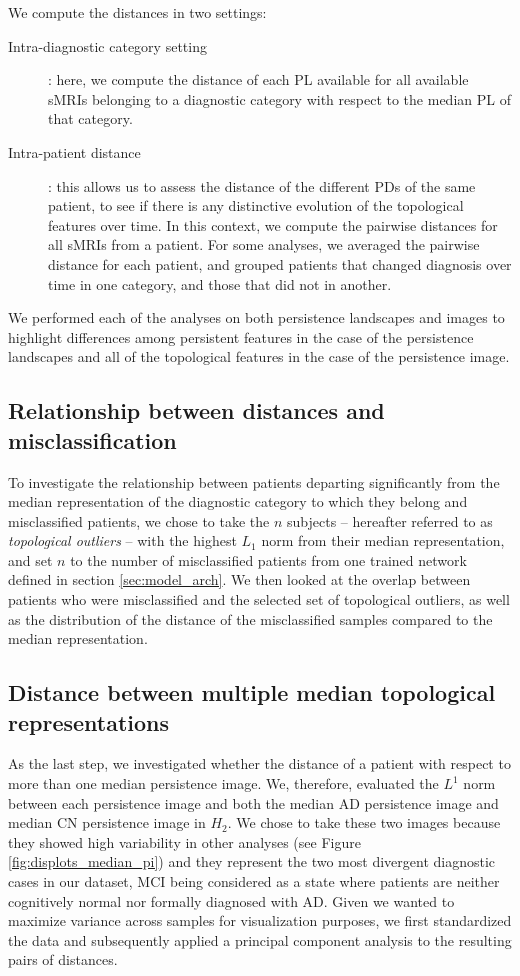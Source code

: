 \documentclass{article}
\begin{document}
We compute the distances in two settings:
\begin{description}
\item[Intra-diagnostic category setting]: here, we compute the distance of each PL available for all
  available sMRIs belonging to a diagnostic category with respect to the median PL of that category.
\item[Intra-patient distance]: this allows us to assess the distance of the different PDs of the
  same patient, to see if there is any distinctive evolution of the topological features over time.
  In this context, we compute the pairwise distances for all sMRIs from a patient. For some
  analyses, we averaged the pairwise distance for each patient, and grouped patients that changed
  diagnosis over time in one category, and those that did not in another.
\end{description}
We performed each of the analyses on both persistence landscapes and images to highlight differences
among persistent features in the case of the persistence landscapes and all of the topological
features in the case of the persistence image.

\subsection{Relationship between distances and misclassification}

To investigate the relationship between patients departing significantly from the median
representation of the diagnostic category to which they belong and misclassified patients, we chose
to take the $n$ subjects -- hereafter referred to as \emph{topological outliers} -- with the highest
$L_1$ norm from their median representation, and set $n$ to the number of misclassified patients
from one trained network defined in section \ref{sec:model_arch}. We then looked at the overlap
between patients who were misclassified and the selected set of topological outliers, as well as the
distribution of the distance of the misclassified samples compared to the median representation.

\subsection{Distance between multiple median topological representations}\label{sec:methods_dist_multiple_images}

As the last step, we investigated whether the distance of a patient with respect to more than one
median persistence image. We, therefore, evaluated the $L^1$ norm between each persistence image and
both the median AD persistence image and median CN persistence image in $H_2$. We chose
to take these two images because they showed high variability in other analyses (see Figure \ref{fig:displots_median_pi}) and they represent the two
most divergent diagnostic cases in our dataset, MCI being considered as a state
where patients are neither cognitively normal nor formally diagnosed with AD. Given we wanted to maximize
variance across samples for visualization purposes, we first standardized the data and subsequently
applied a principal component analysis to the resulting pairs of distances.
\end{document}
